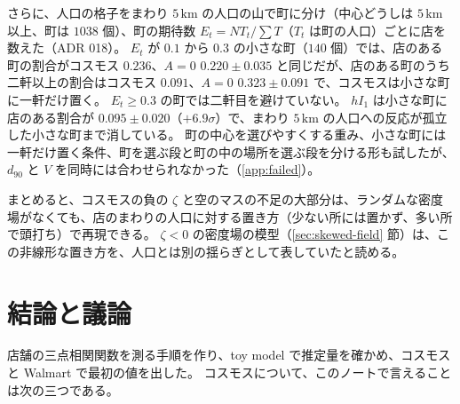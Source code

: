 \documentclass[a4paper,11pt]{ltjsarticle}
\begin{document}
さらに、人口の格子をまわり $5\,\mathrm{km}$ の人口の山で町に分け（中心どうしは $5\,\mathrm{km}$ 以上、町は $1038$ 個）、町の期待数 $E_t = N T_t / \sum T$（$T_t$ は町の人口）ごとに店を数えた（ADR 018）。
$E_t$ が $0.1$ から $0.3$ の小さな町（$140$ 個）では、店のある町の割合がコスモス $0.236$、$A = 0$ $0.220 \pm 0.035$ と同じだが、店のある町のうち二軒以上の割合はコスモス $0.091$、$A = 0$ $0.323 \pm 0.091$ で、コスモスは小さな町に一軒だけ置く。
$E_t \ge 0.3$ の町では二軒目を避けていない。
$hI_1$ は小さな町に店のある割合が $0.095 \pm 0.020$（$+6.9\sigma$）で、まわり $5\,\mathrm{km}$ の人口への反応が孤立した小さな町まで消している。
町の中心を選びやすくする重み、小さな町には一軒だけ置く条件、町を選ぶ段と町の中の場所を選ぶ段を分ける形も試したが、$d_{90}$ と $V$ を同時には合わせられなかった（\ref{app:failed}）。

まとめると、コスモスの負の $\zeta$ と空のマスの不足の大部分は、ランダムな密度場がなくても、店のまわりの人口に対する置き方（少ない所には置かず、多い所で頭打ち）で再現できる。
$\zeta < 0$ の密度場の模型（\ref{sec:skewed-field} 節）は、この非線形な置き方を、人口とは別の揺らぎとして表していたと読める。

\begin{table}[t]
  \centering
  \caption{2 次メッシュの人口 $P_c$ の区間ごとの、店の数と期待数の和の比 $\sum N_c / \sum \lambda_c$。
    「マス」は区間に入るマスの数。$hI_1$ は場を持たず、まわり $5\,\mathrm{km}$ の人口に対する反応 $h$ と $r = 1\,\mathrm{km}$ の近づかない条件だけを持つ模型（各 20 個）。
    模擬データは平均 $\pm$ 標準偏差、括弧の中は（コスモス $-$ 平均）/ 標準偏差。}
  \label{tab:pop-response}
  \footnotesize
  \setlength{\tabcolsep}{2pt}
  
\end{table}

\section{結論と議論}
\label{sec:conclusion}

店舗の三点相関関数を測る手順を作り、toy model で推定量を確かめ、コスモスと Walmart で最初の値を出した。
コスモスについて、このノートで言えることは次の三つである。
\end{document}
